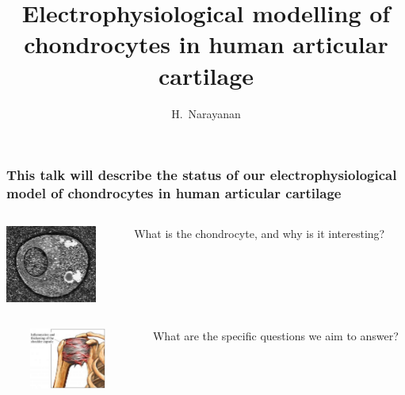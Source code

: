 \documentclass[ignorenonframetext]{beamer}
\title{Electrophysiological modelling of chondrocytes in human
  articular cartilage}
\author{H.~Narayanan}
\institute[]{}
\date[]{}
\begin{document}
%
%
%


\begin{frame}
  \frametitle{This talk will describe the status of our
    electrophysiological model of chondrocytes in human articular
    cartilage}
  \begin{columns}
    \begin{column}{3cm}
      \includegraphics[width=3cm]{../images/pdf/chondrocyte-micrograph}
    \end{column}
    \begin{column}{9cm}
      What is the chondrocyte, and why is it interesting?
    \end{column}
  \end{columns}
  \vspace{0.3cm}
  \begin{columns}
    \begin{column}{1cm}
    \end{column}
    \begin{column}{2.5cm}
      \includegraphics[width=2.5cm]{../images/pdf/frozen-shoulder}
    \end{column}
    \begin{column}{0.1cm}
    \end{column}
    \begin{column}{8.5cm}
      What are the specific questions we aim to answer?
    \end{column}
  \end{columns}
  \vspace{0.3cm}
  \begin{columns}

\end{columns}
\end{frame}
\end{document}
